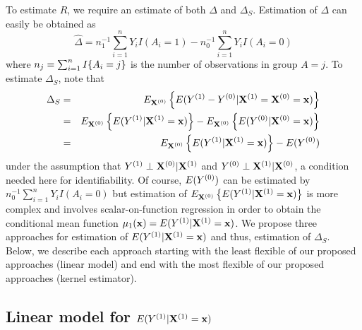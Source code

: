 \documentclass[useAMS,usenatbib,referee]{biom}
\begin{document}
To estimate $R$, we require an estimate of both $\Delta$ and $\Delta_S$. Estimation of $\Delta$ can easily be obtained as $$\hat \Delta = n_1^{-1}\sum_{i=1}^n Y_i I(A_i = 1) - n_0^{-1}\sum_{i=1}^n Y_i I(A_i = 0)$$ where $n_j = \sum_{i=1}^n I\{A_i = j\}$ is the number of observations in group $A = j$. To estimate $\Delta_S$, note that \begin{eqnarray*}
\Delta_S &=& E_{{\bf X}^{(0)}} \left \{ E(Y^{(1)}-Y^{(0)} | {\bf X}^{(1)} = {\bf X}^{(0)}={\bf x})\right \} \\
&=& E_{{\bf X}^{(0)}}\left \{ E(Y^{(1)}| {\bf X}^{(1)} ={\bf x})\right \} - E_{{\bf X}^{(0)}}\left \{ E(Y^{(0)} |  {\bf X}^{(0)}={\bf x}) \right \}\\
&=& E_{{\bf X}^{(0)}}\left \{ E(Y^{(1)}| {\bf X}^{(1)} ={\bf x})\right \} - E(Y^{(0)})
\end{eqnarray*}
under the assumption that $Y^{(1)} \perp {\bf X} ^{(0)} | {\bf X} ^{(1)}$ and $Y^{(0)} \perp {\bf X} ^{(1)} | {\bf X} ^{(0)}$, a condition needed here for identifiability. Of course, $E(Y^{(0)})$ can be estimated by $n_0^{-1}\sum_{i=1}^n Y_i I(A_i = 0)$ but estimation of $E_{{\bf X}^{(0)}}\left \{ E(Y^{(1)}| {\bf X}^{(1)} ={\bf x})\right \}$ is more complex and involves scalar-on-function regression in order to obtain the conditional mean function $\mu_1({\bf x}) = E(Y^{(1)}| {\bf X}^{(1)} ={\bf x})$. We propose three approaches for estimation of $E(Y^{(1)}| {\bf X}^{(1)} ={\bf x})$ and thus, estimation of $\Delta_S$. Below, we describe each approach starting with the least flexible of our proposed approaches (linear model) and end with the most flexible of our proposed approaches (kernel estimator). %

\subsection{Linear model for $E(Y^{(1)}| {\bf X}^{(1)} ={\bf x})$ \label{linearsection}}
\end{document}
